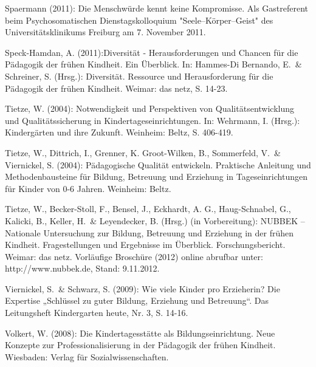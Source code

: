 Spaermann (2011): Die Menschwürde kennt keine Kompromisse. Als Gastreferent beim Psychosomatischen Dienstagskolloquium "Seele–Körper–Geist" des Universitätsklinikums Freiburg am 7. November 2011.

Speck-Hamdan, A. (2011):Diversität - Herausforderungen und Chancen für die Pädagogik der frühen Kindheit. Ein Überblick. In: Hammes-Di Bernando, E.~\& Schreiner, S. (Hrsg.): Diversität. Ressource und Herausforderung für die Pädagogik der frühen Kindheit. Weimar: das netz, S. 14-23.

Tietze, W. (2004): Notwendigkeit und Perspektiven von Qualitätsentwicklung und Qualitätssicherung in Kindertageseinrichtungen. In: Wehrmann, I. (Hrsg.): Kindergärten und ihre Zukunft. Weinheim: Beltz, S. 406-419.

Tietze, W., Dittrich, I., Grenner, K. Groot-Wilken, B., Sommerfeld, V.~\& Viernickel, S. (2004): Pädagogische Qualität entwickeln. Praktische Anleitung und Methodenbausteine für Bildung, Betreuung und Erziehung in Tageseinrichtungen für Kinder von 0-6 Jahren. Weinheim: Beltz.

Tietze, W., Becker-Stoll, F., Bensel, J., Eckhardt, A. G., Haug-Schnabel, G., Kalicki, B., Keller, H.~\& Leyendecker, B. (Hrsg.) (in Vorbereitung): NUBBEK -- Nationale Untersuchung zur Bildung, Betreuung und Erziehung in der frühen Kindheit.
Fragestellungen und Ergebnisse im Überblick. Forschungsbericht. Weimar: das netz. Vorläufige Broschüre (2012) online abrufbar unter: http://www.nubbek.de, Stand:  9.11.2012.

Viernickel, S.~\& Schwarz, S. (2009): Wie viele Kinder pro Erzieherin? Die Expertise „Schlüssel zu guter Bildung, Erziehung und Betreuung“. Das Leitungsheft Kindergarten heute, Nr. 3, S. 14-16.

Volkert, W. (2008): Die Kindertagesstätte als Bildungseinrichtung. Neue Konzepte zur Professionalisierung in der Pädagogik der frühen Kindheit. Wiesbaden: Verlag für Sozialwissenschaften.


